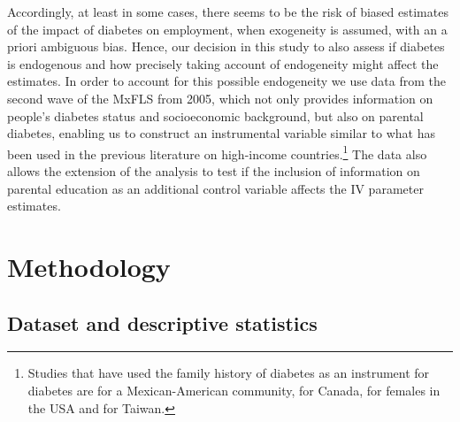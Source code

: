 Accordingly, at least in some cases, there seems to be the
risk of biased estimates of the impact of diabetes on employment,
when exogeneity is assumed, with an a priori ambiguous bias. Hence,
our decision in this study to also assess if diabetes is endogenous
and how precisely taking account of endogeneity might affect the estimates.
  In order to account for this possible endogeneity we use data from
the second wave of the \acf{MxFLS} from 2005, which not only provides
information on people\textquoteright s diabetes status and socioeconomic
background, but also on parental diabetes, enabling us to construct
an instrumental variable similar to what has been used in the previous
literature on high-income countries.\footnote{Studies that have used the family history of diabetes as an instrument
for diabetes are \textcite{Brown2005} for a Mexican-American community,
\textcite{Latif2009} for Canada, \textcite{Minor2011} for females in
the USA and \textcite{Lin2011b} for Taiwan.} The data also allows the extension of the analysis to test if the
inclusion of information on parental education as an additional control
variable affects the \ac{IV} parameter estimates.



\section{\label{sec:Methodology3}Methodology}


\subsection{\label{sub:Data}Dataset and descriptive statistics}

